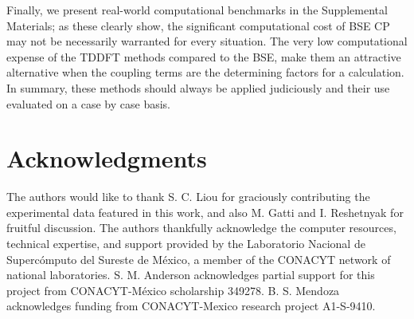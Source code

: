 \documentclass[aps,prb,10pt,showpacs,superscriptaddress,twocolumn,notitlepage]{revtex4-1}
\begin{document}
Finally, we present real-world computational benchmarks in the Supplemental
Materials; as these clearly show, the significant computational cost of BSE CP
may not be necessarily warranted for every situation. The very low computational
expense of the TDDFT methods compared to the BSE, make them an attractive
alternative when the coupling terms are the determining factors for a
calculation. In summary, these methods should always be applied judiciously and
their use evaluated on a case by case basis.


\section{Acknowledgments}

The authors would like to thank S. C. Liou for graciously contributing the
experimental data featured in this work, and also M. Gatti and I. Reshetnyak for
fruitful discussion. The authors thankfully acknowledge the computer resources,
technical expertise, and support provided by the Laboratorio Nacional de
Superc\'omputo del Sureste de M\'exico, a member of the CONACYT network of
national laboratories. S. M. Anderson acknowledges partial support for this
project from CONACYT-M\'exico scholarship 349278. B. S. Mendoza acknowledges
funding from CONACYT-Mexico research project A1-S-9410.




\end{document}

